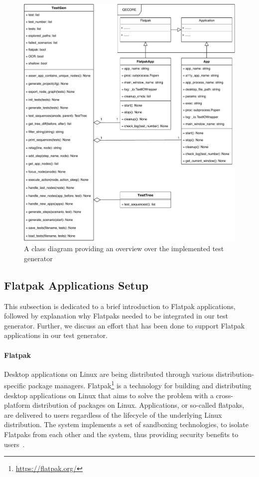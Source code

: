 \begin{figure}[htb!]
	\centering
	\includegraphics[width=1\textwidth,clip]{obrazky-figures/TestGen_class_diagram.pdf}
	\caption{A class diagram providing an overview over the implemented test generator}
	\label{test_gen}
\end{figure}

\subsection{Flatpak Applications Setup}\label{flatpak_setup}

This subsection is dedicated to a brief introduction to Flatpak applications, followed by explanation why Flatpaks needed to be integrated in our test generator. Further, we discuss an effort that has been done to support Flatpak applications in our test generator.

\paragraph{Flatpak} Desktop applications on Linux are being distributed through various distribution-specific package managers. Flatpak\footnote{\url{https://flatpak.org/}} is a technology for building and distributing desktop applications on Linux that aims to solve the problem with a cross-platform distribution of packages on Linux. Applications, or so-called flatpaks, are delivered to users regardless of the lifecycle of the underlying Linux distribution. The system implements a set of sandboxing technologies, to isolate Flatpaks from each other and the system, thus providing security benefits to users~\cite{flatpak}.

